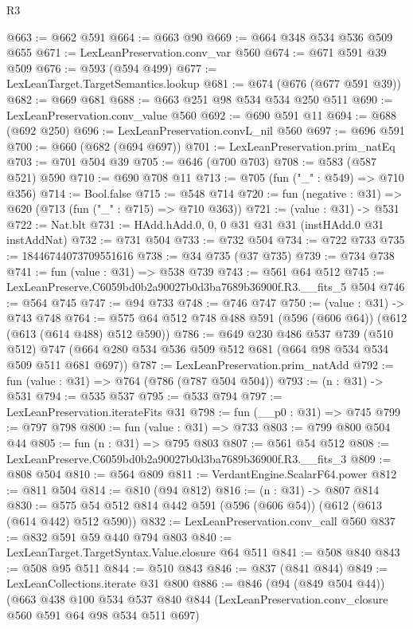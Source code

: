 \begin{lexlean}{R3}
\begin{coremodule}
@663 := @662 @591
@664 := @663 @90
@669 := @664 @348 @534 @536 @509 @655
@671 := LexLeanPreservation.conv_var @560
@674 := @671 @591 @39 @509
@676 := @593 (@594 @499)
@677 := LexLeanTarget.TargetSemantics.lookup
@681 := @674 (@676 (@677 @591 @39))
@682 := @669 @681
@688 := @663 @251 @98 @534 @534 @250 @511
@690 := LexLeanPreservation.conv_value @560
@692 := @690 @591 @11
@694 := @688 (@692 @250)
@696 := LexLeanPreservation.convL_nil @560
@697 := @696 @591
@700 := @660 (@682 (@694 @697))
@701 := LexLeanPreservation.prim_natEq
@703 := @701 @504 @39
@705 := @646 (@700 @703)
@708 := @583 (@587 @521) @590
@710 := @690 @708 @11
@713 := @705 (fun ("_" : @549) => @710 @356)
@714 := Bool.false
@715 := @548 @714
@720 := fun (negative : @31) => @620 (@713 (fun ("_" : @715) => @710 @363))
@721 := (value : @31) -> @531
@722 := Nat.blt
@731 := HAdd.hAdd.{0, 0, 0} @31 @31 @31 (instHAdd.{0} @31 instAddNat)
@732 := @731 @504
@733 := @732 @504
@734 := @722 @733
@735 := 18446744073709551616
@738 := @34 @735 (@37 @735)
@739 := @734 @738
@741 := fun (value : @31) => @538 @739
@743 := @561 @64 @512
@745 := LexLeanPreserve.C6059bd0b2a90027b0d3ba7689b36900f.R3.__fits_5 @504
@746 := @564 @745
@747 := @94 @733
@748 := @746 @747
@750 := (value : @31) -> @743 @748
@764 := @575 @64 @512 @748 @488 @591 (@596 (@606 @64)) (@612 (@613 (@614 @488) @512 @590))
@786 := @649
    @230
    @486
    @537
    @739
    (@510 @512)
    @747
    (@664 @280 @534 @536 @509 @512 @681 (@664 @98 @534 @534 @509 @511 @681 @697))
@787 := LexLeanPreservation.prim_natAdd
@792 := fun (value : @31) => @764 (@786 (@787 @504 @504))
@793 := (n : @31) -> @531
@794 := @535 @537
@795 := @533 @794
@797 := LexLeanPreservation.iterateFits @31
@798 := fun (__p0 : @31) => @745
@799 := @797 @798
@800 := fun (value : @31) => @733
@803 := @799 @800 @504 @44
@805 := fun (n : @31) => @795 @803
@807 := @561 @54 @512
@808 := LexLeanPreserve.C6059bd0b2a90027b0d3ba7689b36900f.R3.__fits_3
@809 := @808 @504
@810 := @564 @809
@811 := VerdantEngine.ScalarF64.power
@812 := @811 @504
@814 := @810 (@94 @812)
@816 := (n : @31) -> @807 @814
@830 := @575 @54 @512 @814 @442 @591 (@596 (@606 @54)) (@612 (@613 (@614 @442) @512 @590))
@832 := LexLeanPreservation.conv_call @560
@837 := @832 @591 @59 @440 @794 @803
@840 := LexLeanTarget.TargetSyntax.Value.closure @64 @511
@841 := @508 @840
@843 := @508 @95 @511
@844 := @510 @843
@846 := @837 (@841 @844)
@849 := LexLeanCollections.iterate @31 @800
@886 := @846
    (@94 (@849 @504 @44))
    (@663
      @438
      @100
      @534
      @537
      @840
      @844
      (LexLeanPreservation.conv_closure @560 @591 @64 @98 @534 @511 @697)

\end{coremodule}
\end{lexlean}
